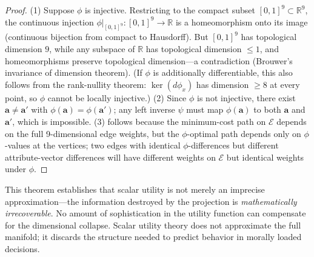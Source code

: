 \documentclass[12pt]{article}
\theoremstyle{definition}
\theoremstyle{remark}
\newcommand{\E}{\mathcal{E}}               %
\newcommand{\R}{\mathbb{R}}
\begin{document}
\begin{proof}
(1) Suppose $\phi$ is injective.  Restricting to the compact subset $[0,1]^9 \subset \R^9$, the continuous injection $\phi|_{[0,1]^9}: [0,1]^9 \to \R$ is a homeomorphism onto its image (continuous bijection from compact to Hausdorff).  But $[0,1]^9$ has topological dimension $9$, while any subspace of $\R$ has topological dimension $\leq 1$, and homeomorphisms preserve topological dimension---a contradiction (Brouwer's invariance of dimension theorem).  (If $\phi$ is additionally differentiable, this also follows from the rank-nullity theorem: $\ker(d\phi_x)$ has dimension $\geq 8$ at every point, so $\phi$ cannot be locally injective.)  (2) Since $\phi$ is not injective, there exist $\mathbf{a} \neq \mathbf{a}'$ with $\phi(\mathbf{a}) = \phi(\mathbf{a}')$; any left inverse $\psi$ must map $\phi(\mathbf{a})$ to both $\mathbf{a}$ and $\mathbf{a}'$, which is impossible.  (3) follows because the minimum-cost path on $\E$ depends on the full 9-dimensional edge weights, but the $\phi$-optimal path depends only on $\phi$-values at the vertices; two edges with identical $\phi$-differences but different attribute-vector differences will have different weights on $\E$ but identical weights under $\phi$.
\end{proof}

This theorem establishes that scalar utility is not merely an imprecise approximation---the information destroyed by the projection is \emph{mathematically irrecoverable}.  No amount of sophistication in the utility function can compensate for the dimensional collapse.  Scalar utility theory does not approximate the full manifold; it discards the structure needed to predict behavior in morally loaded decisions.
\end{document}
